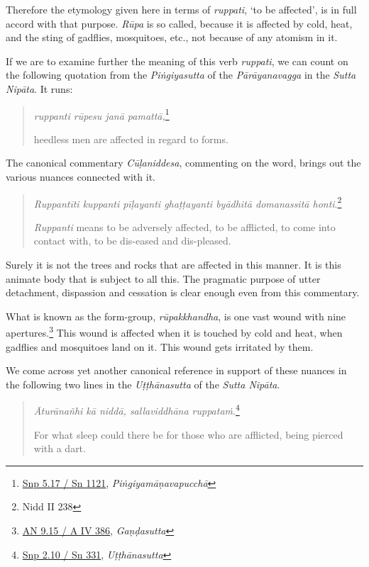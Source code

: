 Therefore the etymology given here in terms of \emph{ruppati}, `to be affected', is in full accord with that purpose. \emph{Rūpa} is so called, because it is affected by cold, heat, and the sting of gadflies, mosquitoes, etc., not because of any atomism in it.

If we are to examine further the meaning of this verb \emph{ruppati}, we can count on the following quotation from the \emph{Piṅgiyasutta} of the \emph{Pārāyanavagga} in the \emph{Sutta Nipāta}. It runs:

\begin{quote}
\emph{ruppanti rūpesu janā pamattā,}\footnote{\href{https://suttacentral.net/snp5.17/pli/ms}{Snp 5.17 / Sn 1121}, \emph{Piṅgiyamāṇavapucchā}}

heedless men are affected in regard to forms.
\end{quote}

The canonical commentary \emph{Cūḷaniddesa}, commenting on the word, brings out the various nuances connected with it.

\begin{quote}
\emph{Ruppantīti kuppanti pīḷayanti ghaṭṭayanti byādhitā domanassitā honti}.\footnote{Nidd II 238}

\emph{Ruppanti} means to be adversely affected, to be afflicted, to come into contact with, to be dis-eased and dis-pleased.
\end{quote}

Surely it is not the trees and rocks that are affected in this manner. It is this animate body that is subject to all this. The pragmatic purpose of utter detachment, dispassion and cessation is clear enough even from this commentary.

What is known as the form-group, \emph{rūpakkhandha}, is one vast wound with nine apertures.\footnote{\href{https://suttacentral.net/an9.15/pli/ms}{AN 9.15 / A IV 386}, \emph{Gaṇḍasutta}} This wound is affected when it is touched by cold and heat, when gadflies and mosquitoes land on it. This wound gets irritated by them.

We come across yet another canonical reference in support of these nuances in the following two lines in the \emph{Uṭṭhānasutta} of the \emph{Sutta Nipāta}.

\begin{quote}
\emph{Āturānañhi kā niddā, sallaviddhāna ruppataṁ}.\footnote{\href{https://suttacentral.net/snp2.10/pli/ms}{Snp 2.10 / Sn 331}, \emph{Uṭṭhānasutta}}

For what sleep could there be for those who are afflicted, being pierced with a dart.
\end{quote}

